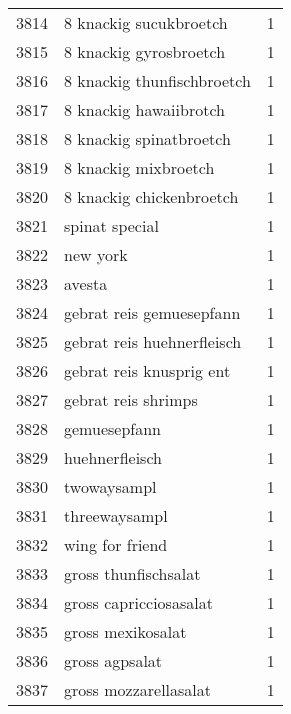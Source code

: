 \begin{tabular}{llr}
3814 &                             8 knackig sucukbroetch &      1 \\
3815 &                             8 knackig gyrosbroetch &      1 \\
3816 &                         8 knackig thunfischbroetch &      1 \\
3817 &                             8 knackig hawaiibrotch &      1 \\
3818 &                            8 knackig spinatbroetch &      1 \\
3819 &                               8 knackig mixbroetch &      1 \\
3820 &                           8 knackig chickenbroetch &      1 \\
3821 &                                     spinat special &      1 \\
3822 &                                           new york &      1 \\
3823 &                                             avesta &      1 \\
3824 &                           gebrat reis gemuesepfann &      1 \\
3825 &                         gebrat reis huehnerfleisch &      1 \\
3826 &                           gebrat reis knusprig ent &      1 \\
3827 &                                gebrat reis shrimps &      1 \\
3828 &                                       gemuesepfann &      1 \\
3829 &                                     huehnerfleisch &      1 \\
3830 &                                        twowaysampl &      1 \\
3831 &                                      threewaysampl &      1 \\
3832 &                                    wing for friend &      1 \\
3833 &                               gross thunfischsalat &      1 \\
3834 &                             gross capricciosasalat &      1 \\
3835 &                                  gross mexikosalat &      1 \\
3836 &                                     gross agpsalat &      1 \\
3837 &                              gross mozzarellasalat &      1 \\

\end{tabular}
